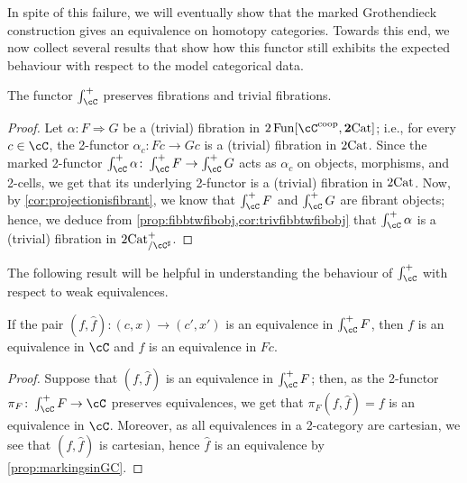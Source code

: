 \documentclass[11pt, dvipsnames]{amsart}
\begin{document}
In spite of this failure, we will eventually show that the marked Grothendieck construction gives an equivalence on homotopy categories. Towards this end, we now collect several results that show how this functor still exhibits the expected behaviour with respect to the model categorical data.

    \begin{prop}\label{lemma:Grothendieck_constr_preserves_fibrations}
        The functor $\int^+_{\cC}$ preserves fibrations and trivial fibrations. 
    \end{prop}

    \begin{proof}
        Let $\alpha\colon F\Rightarrow G$ be a (trivial) fibration in $2\Fun[\cC^{\coop},\ttwocat]$; i.e., for every $c\in \cC$, the 2-functor $\alpha_c\colon Fc\to Gc$ is a (trivial) fibration in $2\mathrm{Cat}$. Since the marked 2-functor $\int_{\cC}^+ \alpha\colon \int_{\cC}^+ F\to \int_{\cC}^+ G$ acts as $\alpha_c$ on objects, morphisms, and 2-cells, we get that its underlying 2-functor is a (trivial) fibration in $2\mathrm{Cat}$. Now, by \cref{cor:projectionisfibrant}, we know that $\int_{\cC}^+ F$ and $\int_{\cC}^+ G$ are  fibrant objects; hence, we deduce from  \cref{prop:fibbtwfibobj,cor:trivfibbtwfibobj} that $\int_{\cC}^+ \alpha$ is a (trivial) fibration in $\twocat^+_{/\cC^\sharp}$.
    \end{proof}



The following result will be helpful in understanding the behaviour of $\int_\cC^+$ with respect to weak equivalences. 

    \begin{lem}\label{lem:equiv_then_coordinatewise_equiv} If the pair $(f,\widehat{f})\colon(c,x)\to (c',x')$ is an equivalence in $\int^+_{\cC} F$, then $f$ is an equivalence in $\cC$ and $\widehat{f}$ is an equivalence in $Fc$.
    \end{lem}
    \begin{proof}
Suppose that $(f,\widehat{f})$ is an equivalence in $\int^+_{\cC} F$; then, as the 2-functor $\pi_F\colon \int^+_{\cC} F\to \cC$ preserves equivalences, we get that $\pi_F(f,\widehat{f})=f$ is an equivalence in $\cC$. Moreover, as all equivalences in a 2-category are cartesian, we see that $(f,\widehat{f})$ is cartesian, hence $\widehat{f}$ is an equivalence by \cref{prop:markingsinGC}.
    \end{proof}
\end{document}
